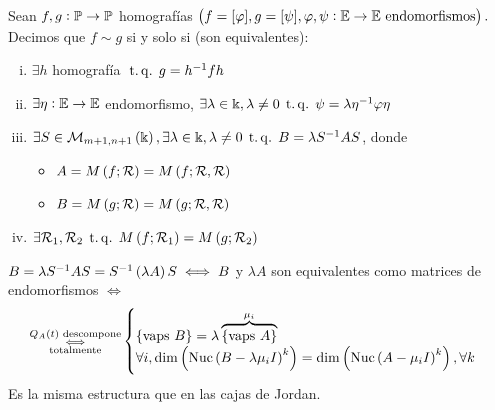 \begin{defi}
    Sean $f, g : \mathbb{P} \to \mathbb{P}$ homografías $\left( f = [\varphi], g = [\psi], \varphi, \psi : \mathbb{E} \to \mathbb{E} \text{ endomorfismos}\right).$ Decimos que $f \sim g$ si y solo si (son equivalentes):
    \begin{enumerate}[(i)]
        \item $\exists h$ homografía $\operatorname{\;t.q.\;} g = h^{-1}fh$
        \item $\exists \eta : \mathbb{E} \to \mathbb{E}$ endomorfismo, $\exists \lambda \in \Bbbk, \lambda \neq 0 \operatorname{\;t.q.\;} \psi = \lambda \eta^{-1} \varphi \eta$
        \item $\exists S \in \mathcal{M}_{m+1, n+1}\left(\Bbbk\right), \exists \lambda\in\Bbbk, \lambda \neq 0 \operatorname{\;t.q.\;} B = \lambda S^{-1} A S$, donde
        \begin{itemize}
            \item $A = M\left( f; \mathcal{R}\right) = M\left( f; \mathcal{R},\mathcal{R}\right)$
            \item $B = M\left( g; \mathcal{R}\right) = M\left( g; \mathcal{R},\mathcal{R}\right)$
        \end{itemize}
        \item $\exists \mathcal{R}_1,\mathcal{R}_2\operatorname{\;t.q.\;} M\left( f;\mathcal{R}_1\right) = M \left( g; \mathcal{R}_2\right)$
    \end{enumerate}
\end{defi}
\begin{obs}
    $B = \lambda S^{-1} A S = S^{-1} \left( \lambda A \right) S \iff B$ y $\lambda A$ son equivalentes como matrices de endomorfismos $\iff$
    \[
        \substack{Q_A\left( t \right) \text{ descompone} \\ \iff \\ \text{totalmente}}
        \begin{cases}
            \{ \text{vaps } B \} = \lambda \overbrace{\{ \text{vaps } A \}}^{\mu_i} \\
            \forall i, \dim \left( \text{Nuc}\left( B - \lambda \mu_i I\right)^k \right) = \dim \left(\text{Nuc}\left( A - \mu_i I \right) ^k \right), \forall k
        \end{cases}
    \]
    Es la misma estructura que en las cajas de Jordan.
\end{obs}
